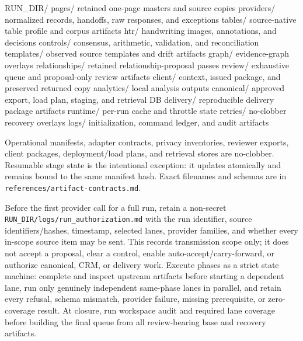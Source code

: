 \documentclass[
]{article}
\newenvironment{Shaded}{}{}
\newcommand{\NormalTok}[1]{#1}
\begin{document}
\begin{Shaded}
\begin{Highlighting}[]
\NormalTok{RUN\_DIR/}
\NormalTok{  pages/                  retained one{-}page masters and source copies}
\NormalTok{  providers/              normalized records, handoffs, raw responses, and exceptions}
\NormalTok{  tables/                 source{-}native table profile and corpus artifacts}
\NormalTok{  htr/                    handwriting images, annotations, and decisions}
\NormalTok{  controls/               consensus, arithmetic, validation, and reconciliation}
\NormalTok{  templates/              observed source templates and drift artifacts}
\NormalTok{  graph/                  evidence{-}graph overlays}
\NormalTok{  relationships/          retained relationship{-}proposal passes}
\NormalTok{  review/                 exhaustive queue and proposal{-}only review artifacts}
\NormalTok{  client/                 context, issued package, and preserved returned copy}
\NormalTok{  analytics/              local analysis outputs}
\NormalTok{  canonical/              approved export, load plan, staging, and retrieval DB}
\NormalTok{  delivery/               reproducible delivery package artifacts}
\NormalTok{  runtime/                per{-}run cache and throttle state}
\NormalTok{  retries/                no{-}clobber recovery overlays}
\NormalTok{  logs/                   initialization, command ledger, and audit artifacts}
\end{Highlighting}
\end{Shaded}

Operational manifests, adapter contracts, privacy inventories, reviewer
exports, client packages, deployment/load plans, and retrieval stores
are no-clobber. Resumable stage state is the intentional exception: it
updates atomically and remains bound to the same manifest hash. Exact
filenames and schemas are in
\texttt{references/\allowbreak{}artifact-\allowbreak{}contracts.md}.

Before the first provider call for a full run, retain a non-secret
\texttt{RUN\_\allowbreak{}DIR/\allowbreak{}logs/\allowbreak{}run\_\allowbreak{}authorization.md}
with the run identifier, source identifiers/hashes, timestamp, selected
lanes, provider families, and whether every in-scope source item may be
sent. This records transmission scope only; it does not accept a
proposal, clear a control, enable auto-accept/carry-forward, or
authorize canonical, CRM, or delivery work. Execute phases as a strict
state machine: complete and inspect upstream artifacts before starting a
dependent lane, run only genuinely independent same-phase lanes in
parallel, and retain every refusal, schema mismatch, provider failure,
missing prerequisite, or zero-coverage result. At closure, run workspace
audit and required lane coverage before building the final queue from
all review-bearing base and recovery artifacts.
\end{document}
